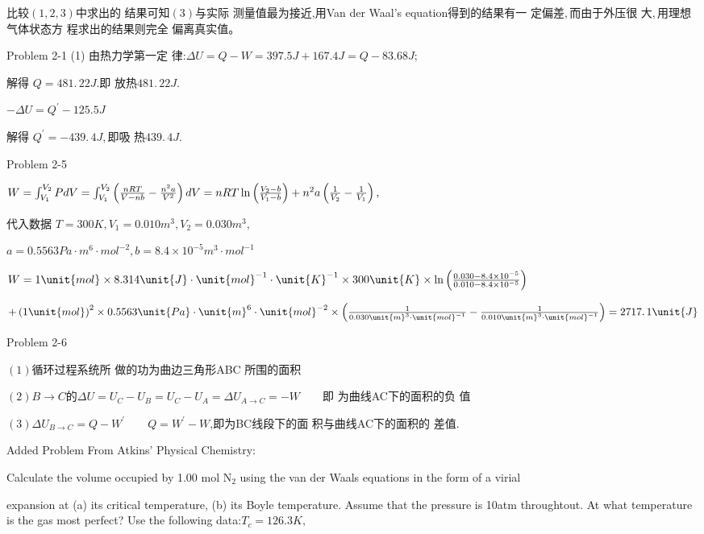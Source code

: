 \documentclass{article}
\begin{document}
比较$\left( 1,2,3\right) $中求出的%
结果可知$\left( 3\right) $与实际%
测量值最为接近,用Van der
Waal's equation得到的结果有一%
定偏差$,$而由于外压很%
大$,$用理想气体状态方%
程求出的结果则完全%
偏离真实值$。 $

Problem 2-1 (1) 由热力学第一定%
律:$\Delta U=Q-W=397.5\unit{J}+167.4\unit{J}=Q-83.68\unit{J};$

解得 $Q=\allowbreak 481.\,\allowbreak 22\unit{J}.$即%
放热$\allowbreak 481.\,\allowbreak 22\unit{J}.$

$-\Delta U=Q^{\prime }-125.5\unit{J}$

解得 $Q^{\prime }=-439.\,\allowbreak 4\unit{J},$即吸%
热$439.\,\allowbreak 4\unit{J}.$

Problem 2-5

$W=\int_{V_{1}}^{V_{2}}PdV=\int_{V_{1}}^{V_{2}}\left( \frac{nRT}{V-nb}-\frac{%
n^{2}a}{V^{2}}\right) dV=nRT\ln \left( \frac{V_{2}-b}{V_{1}-b}\right)
+n^{2}a\left( \frac{1}{V_{2}}-\frac{1}{V_{1}}\right) ,$

代入数据 $T=300\unit{K},V_{1}=0.010\unit{m}%
^{3},V_{2}=0.030\unit{m}^{3},$

$a=0.5563\unit{Pa}\cdot \unit{m}^{6}\cdot \unit{mol}^{-2},b=8.4\times 10^{-5}%
\unit{m}^{3}\cdot \unit{mol}^{-1}$

$W=1\unit{mol}\times 8.314\unit{J}\cdot \unit{mol}^{-1}\cdot \unit{K}%
^{-1}\times 300\unit{K}\times \ln \left( \frac{0.030-8.4\times 10^{-5}}{%
0.010-8.4\times 10^{-5}}\right) $

$+\left( 1\unit{mol}\right) ^{2}\times 0.5563\unit{Pa}\cdot \unit{m}%
^{6}\cdot \unit{mol}^{-2}\times \left( \frac{1}{0.030\unit{m}^{3}\cdot \unit{%
mol}^{-1}}-\frac{1}{0.010\unit{m}^{3}\cdot \unit{mol}^{-1}}\right)
=\allowbreak 2717.\,\allowbreak 1\unit{J}$

Problem 2-6

$\left( 1\right) $循环过程系统所%
做的功为曲边三角形ABC%
所围的面积

$\left( 2\right) B\rightarrow C$的$\Delta
U=U_{C}-U_{B}=U_{C}-U_{A}=\Delta U_{A\rightarrow C}=-W\qquad $即%
为曲线AC下的面积的负%
值

$\left( 3\right) \Delta U_{B\rightarrow C}=Q-W^{\prime }\qquad Q=W^{\prime
}-W$,\qquad 即为BC线段下的面%
积与曲线AC下的面积的%
差值.

Added Problem From Atkins' Physical Chemistry:

Calculate the volume occupied by 1.00 mol N$_{2}$ using the van der Waals
equations in the form of a virial

expansion at (a) its critical temperature, (b) its Boyle temperature. Assume
that the pressure is 10atm throughtout. At what temperature is the gas most
perfect? Use the following data:$T_{c}=126.3\unit{K},$
\end{document}
